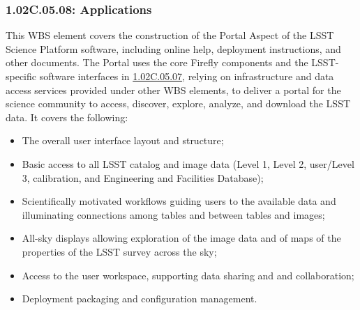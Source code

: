 \subsubsection{1.02C.05.08: Applications}
\label{wbs:1.02C.05.08}

This WBS element covers the construction of the Portal Aspect of the LSST Science Platform software, including online help, deployment instructions, and other documents. The Portal uses the core Firefly components and the LSST-specific software interfaces in \hyperref[wbs:1.02C.05.07]{1.02C.05.07}, relying on infrastructure and data access services provided under other WBS elements, to deliver a portal for the science community to access, discover, explore, analyze, and download the LSST data. It covers the following:
\begin{itemize}

\item{The overall user interface layout and structure;}
\item{Basic access to all LSST catalog and image data (Level 1, Level 2, user/Level 3, calibration, and Engineering and Facilities Database);}
\item{Scientifically motivated workflows guiding users to the available data and illuminating connections among tables and between tables and images;}
\item{All-sky displays allowing exploration of the image data and of maps of the properties of the LSST survey across the sky;}
\item{Access to the user workspace, supporting data sharing and and collaboration;}
\item{Deployment packaging and configuration management.}

\end{itemize}
